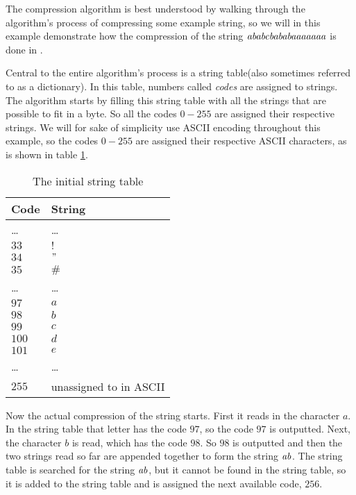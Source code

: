 The \lzw compression algorithm is best
understood by walking through the \lzw algorithm's process of
compressing some example string, so we will in this example
demonstrate how the compression of the string
$\mathit{ababcbababaaaaaaa}$ is done in \lzw.

Central to the entire algorithm's process is a string table(also
sometimes referred to as a dictionary). In this table, numbers called
\textit{codes} are assigned to strings. The algorithm starts by
filling this string table with all the strings that are possible to
fit in a byte. So all the codes $0-255$ are assigned their respective
strings. We will for sake of simplicity use ASCII encoding throughout
this example, so the codes $0-255$ are assigned their respective ASCII
characters, as is shown in table \ref{tab:str-tab-ascii}.

\begin{table}
  \centering
  \begin{tabular}{ll}
    \toprule
    Code & String\\
    \midrule
    \dots & \dots \\
    $33$ & $!$ \\
    $34$ & $"$ \\
    $35$ & $\#$ \\
    \dots & \dots \\
    $97$ & $a$ \\
    $98$ & $b$ \\
    $99$ & $c$ \\
    $100$ & $d$ \\
    $101$ & $e$ \\
    \dots & \dots \\
    $255$ & unassigned to in ASCII \\
    \bottomrule
  \end{tabular}
  \caption{The initial \lzw string table}
  \label{tab:str-tab-ascii}
\end{table}

Now the actual compression of the string starts. First it reads in the
character $a$. In the string table that letter has the code $97$,
so the code $97$ is outputted. Next, the character $b$ is read,
which has the code $98$. So $98$ is outputted and then the two strings
read so far are appended together to form the string $\mathit{ab}$. The
string table is searched for the string $\mathit{ab}$, but it cannot be
found in the string table, so it is added to the string table and is
assigned the next available code, $256$.

